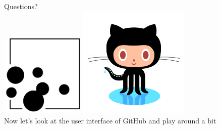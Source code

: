 \documentclass{beamer}\usepackage{graphicx, color}
\begin{document}
\begin{frame}
\huge Questions?  \\
\vspace{1cm}
\includegraphics[width=0.3\textwidth]{ceesglogo.png}
\hfill \includegraphics[width=0.4\textwidth]{github-logo.png}\\
\pause
\normalsize Now let's look at the user interface of GitHub and play around a bit 
\end{frame}
\end{document}
